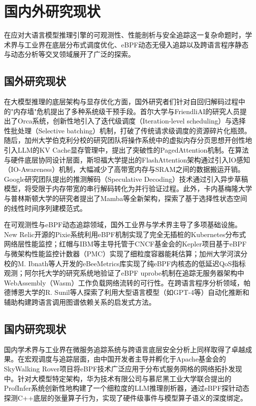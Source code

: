\section{国内外研究现状}

在应对大语言模型推理引擎的可观测性、性能剖析与安全追踪这一复杂命题时，学术界与工业界在底层分布式调度优化、eBPF动态无侵入追踪以及跨语言程序静态与动态分析等交叉领域展开了广泛的探索。

\subsection{国外研究现状}

在大模型推理的底层架构与显存优化方面，国外研究者们针对自回归解码过程中的"内存墙"危机提出了多种系统级干预手段。首尔大学与FriendliAI的研究人员提出了Orca系统，创新性地引入了迭代级调度（Iteration-level scheduling）与选择性批处理（Selective batching）机制，打破了传统请求级调度的资源碎片化瓶颈。随后，加州大学伯克利分校的研究团队将操作系统中的虚拟内存分页思想开创性地引入LLM的KV Cache显存管理中，提出了突破性的PagedAttention机制。在算法与硬件底层协同设计层面，斯坦福大学提出的FlashAttention架构通过引入IO感知（IO-Awareness）机制，大幅减少了高带宽内存与SRAM之间的数据搬运开销。Google研究团队提出的推测解码（Speculative Decoding）技术通过引入异步草稿模型，将受限于内存带宽的串行解码转化为并行验证过程。此外，卡内基梅隆大学与普林斯顿大学的研究者提出了Mamba等全新架构，探索了基于选择性状态空间的线性时间序列建模范式。

在可观测性与eBPF动态追踪领域，国外工业界与学术界主导了多项基础设施。New Relic开源的Pixie系统利用eBPF机制实现了完全无插桩的Kubernetes分布式网络层性能监控；红帽与IBM等主导托管于CNCF基金会的Kepler项目基于eBPF与微架构性能监控计数器（PMC）实现了细粒度容器能耗估算；加州大学河滨分校的M. Ibnath等人开发的eBeeMetrics库实现了纯eBPF内核态的低延迟QoS指标观测；阿尔托大学的研究系统地验证了eBPF uprobe机制在追踪无服务器架构中WebAssembly（Wasm）工作负载网络流转的可行性。在跨语言程序分析领域，帕德博恩大学的R. Sunil等人探索了利用大型语言模型（如GPT-4等）自动化推断和辅助构建跨语言调用图谱依赖关系的启发式方法。

\subsection{国内研究现状}

国内学术界与工业界在微服务追踪系统与跨语言底层安全分析上同样取得了卓越成果。在宏观调度与追踪层面，由中国开发者主导并孵化于Apache基金会的SkyWalking Rover项目将eBPF技术广泛应用于分布式服务网格的网络拓扑发现中。针对大模型特定架构，华为技术有限公司与慕尼黑工业大学联合提出的ProfInfer系统创新性地构建了一个细粒度的LLM推理剖析器，通过eBPF探针动态探测C++底层的张量算子行为，实现了硬件级事件与模型算子语义的深度绑定。

